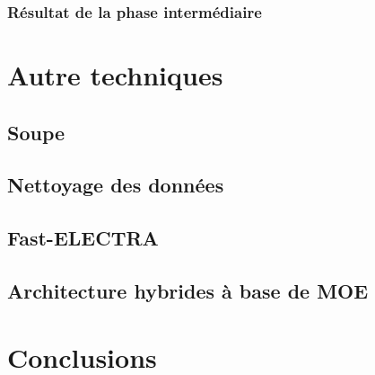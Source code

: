 \documentclass[12pt,twoside,maitrise]{dms}
\theoremstyle{definition}
\numberwithin{equation}{section}
\numberwithin{table}{chapter}
\numberwithin{figure}{chapter}
\begin{document}
\subsection{Résultat de la phase intermédiaire}
\chapter{Autre techniques} \label{chapitre:autretechnique}
\section{Soupe}
\section{Nettoyage des données}
\section{Fast-ELECTRA}
\section{Architecture hybrides à base de MOE}
\chapter{Conclusions}




\def\bibname{R\'ef\'erences} %
\end{document}
